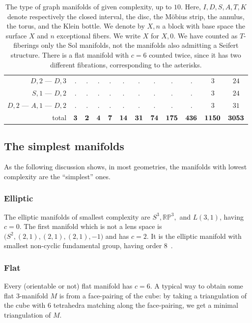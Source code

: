 \documentclass[10pt]{article}      %
\newcommand{\matRP} {\ensuremath {\mathbb{RP}}}
\begin{document}
\begin{table}
\begin{center}
\begin{tabular}{rccccccccccc}
			$D, 2$ --- $D, 3$ 
			& . & . & .   & .   & .   & .    & .      & .    & .     & $3$   & $24$ \\

			$S, 1$ --- $D, 2$  
			& . & . & .   & .   & .   & .    & .      & .    & .     & $3$   & $24$ \\

			$D, 2$ --- $A, 1$ --- $D, 2$ 
			& . & . & .   & .   & .   & .    & .      & .    & .     & $3$   & $31$ \\

      total  
			& $\bf{3}$ & $\bf{2}$ & $\bf{4}$ & $\bf{7}$ & $\bf{14}$ & $\bf{31}$ & $\bf{74}$ & $\bf{175}$ & $\bf{436}$ & $\bf{1150}$ & $\bf{3053}$ \\

    \end{tabular}
  \end{center} 
  \caption{The type of graph manifolds of
    given complexity, up to $10$. Here, $I, D, S, A, T, K$ denote respectively the closed interval,
		the disc, the M\"obius strip, the annulus, the torus, and the Klein bottle. We denote by
		$X,n$ a block with base space the surface $X$ and $n$ exceptional fibers. We write $X$ for
		$X,0$. We have counted as $T$-fiberings only the Sol manifolds, not the manifolds also admitting
		a Seifert structure. 
		There is a flat manifold with $c=6$ counted twice, since it has two different fibrations,
		corresponding to the asterisks.}
  \label{Seifert:table}
\end{table}

\subsection{The simplest manifolds}
As the following discussion shows, in most geometries,
the manifolds with lowest complexity are the ``simplest'' ones.

\subsubsection{Elliptic} The elliptic manifolds of smallest complexity are 
$S^3, \matRP^3,$ and $L(3,1)$, having $c=0$.
The first manifold which is not a lens space is
$\big(S^2,(2,1),(2,1),(2,1),-1\big)$ and has $c=2$. 
It is the elliptic manifold with
smallest non-cyclic fundamental group, having order $8$~\cite{Mat:book}. 

\subsubsection{Flat}
Every (orientable or not) flat manifold has $c=6$. A typical way to obtain some flat
3-manifold $M$ is from a face-pairing of the cube: by taking a triangulation
of the cube with $6$ tetrahedra matching along the face-pairing, 
we get a minimal triangulation of $M$.
\end{document}
